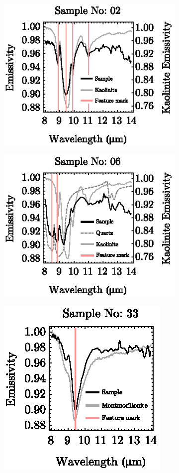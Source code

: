 \begin{appendices}
\begin{figure}[!t]
	\centering
	\vspace{1em}
	\begin{subfigure}[t]{.3\linewidth}
		\centering
		\includegraphics[scale=1]{pics/Chapter_05/Sample_no_02.eps}
		\caption{}
	\end{subfigure}
	\hspace{1em}
	\begin{subfigure}[t]{.3\linewidth}
		\centering
		\includegraphics[scale=1]{pics/Chapter_05/Sample_no_06.eps}
		\caption{}
	\end{subfigure}
	\hspace{1em}
	\begin{subfigure}[t]{.3\linewidth}
		\centering
		\includegraphics[scale=1]{pics/Chapter_05/Sample_no_33.eps}

\end{subfigure}
\end{figure}
\end{appendices}
